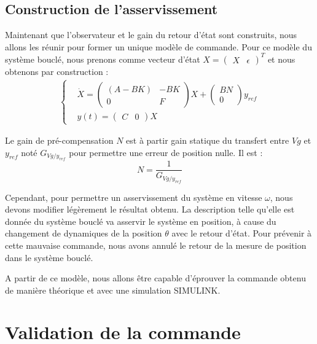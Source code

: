 \subsection{Construction de l'asservissement}\label{sub:constructionAsservissement}
Maintenant que l'observateur et le gain du retour d'état sont construits, nous allons les réunir pour former un unique modèle de commande. Pour ce modèle du système bouclé, nous prenons comme vecteur d'état $X=\begin{pmatrix}
X&\epsilon
\end{pmatrix}^T$ et nous obtenons par construction :
\begin{align*}
\label{eqn:systemeEE2_bf}
\left\lbrace
\begin{aligned}
& \dot{X} = \begin{pmatrix}
(A-BK) & -BK\\
0& F
\end{pmatrix}X+\begin{pmatrix}
BN\\0
\end{pmatrix}y_{ref} \\
& y(t) = \begin{pmatrix}
C & 0
\end{pmatrix}X
\end{aligned}
\right.
\end{align*} 

Le gain de pré-compensation $N$ est à partir gain statique du transfert entre $Vg$ et $y_{ref}$ noté $G_{Vg/y_{ref}}$ pour permettre une erreur de position nulle. Il est : 
\begin{equation}
N = \frac{1}{G_{Vg/y_{ref}}}
\end{equation}


Cependant, pour permettre un asservissement du système en vitesse $\omega$, nous devons modifier légèrement le résultat obtenu. La description telle qu'elle est donnée du système bouclé va asservir le système en position, à cause du changement de dynamiques de la position $\theta$ avec le retour d'état. Pour prévenir à cette mauvaise commande, nous avons annulé le retour de la mesure de position dans le système bouclé. 


A partir de ce modèle, nous allons être capable d'éprouver la commande obtenu de manière théorique et avec une simulation SIMULINK.

\section{Validation de la commande}
